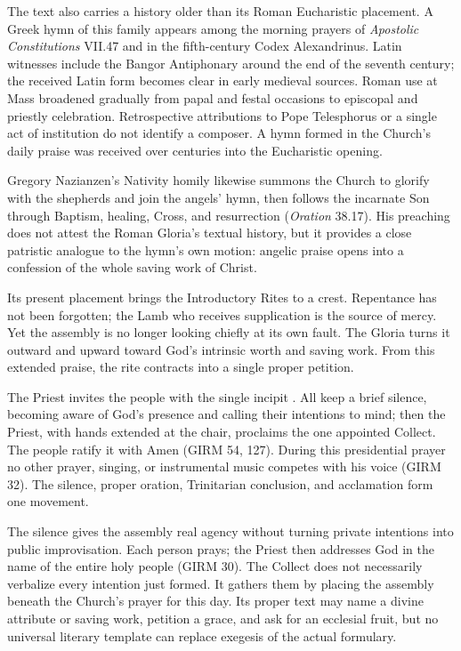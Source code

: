 The text also carries a history older than its Roman Eucharistic placement. A Greek hymn of this family appears among the morning prayers of \emph{Apostolic Constitutions} VII.47 and in the fifth-century Codex Alexandrinus. Latin witnesses include the Bangor Antiphonary around the end of the seventh century; the received Latin form becomes clear in early medieval sources. Roman use at Mass broadened gradually from papal and festal occasions to episcopal and priestly celebration. Retrospective attributions to Pope Telesphorus or a single act of institution do not identify a composer. A hymn formed in the Church's daily praise was received over centuries into the Eucharistic opening.

Gregory Nazianzen's Nativity homily likewise summons the Church to glorify with the shepherds and join the angels' hymn, then follows the incarnate Son through Baptism, healing, Cross, and resurrection (\emph{Oration} 38.17). His preaching does not attest the Roman Gloria's textual history, but it provides a close patristic analogue to the hymn's own motion: angelic praise opens into a confession of the whole saving work of Christ.

Its present placement brings the Introductory Rites to a crest. Repentance has not been forgotten; the Lamb who receives supplication is the source of mercy. Yet the assembly is no longer looking chiefly at its own fault. The Gloria turns it outward and upward toward God's intrinsic worth and saving work. From this extended praise, the rite contracts into a single proper petition.


The Priest invites the people with the single incipit . All keep a brief silence, becoming aware of God's presence and calling their intentions to mind; then the Priest, with hands extended at the chair, proclaims the one appointed Collect. The people ratify it with Amen (GIRM 54, 127). During this presidential prayer no other prayer, singing, or instrumental music competes with his voice (GIRM 32). The silence, proper oration, Trinitarian conclusion, and acclamation form one movement.

The silence gives the assembly real agency without turning private intentions into public improvisation. Each person prays; the Priest then addresses God in the name of the entire holy people (GIRM 30). The Collect does not necessarily verbalize every intention just formed. It gathers them by placing the assembly beneath the Church's prayer for this day. Its proper text may name a divine attribute or saving work, petition a grace, and ask for an ecclesial fruit, but no universal literary template can replace exegesis of the actual formulary.

